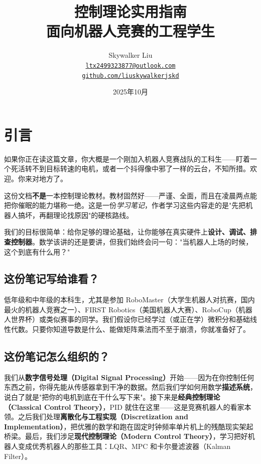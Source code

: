 \documentclass[UTF8]{ctexart}
\title{控制理论实用指南\\
\large 面向机器人竞赛的工程学生}
\author{Skywalker Liu\\
\href{mailto:ltx2499323877@outlook.com}{\texttt{ltx2499323877@outlook.com}} \quad\\
\quad
\href{https://github.com/liuskywalkerjskd}{\texttt{github.com/liuskywalkerjskd}}}
\date{2025年10月}
\begin{document}
\maketitle

\newpage
\tableofcontents
\newpage

\section{引言}

如果你正在读这篇文章，你大概是一个刚加入机器人竞赛战队的工科生——盯着一个死活转不到目标转速的电机，或者一个抖得像中邪了一样的云台，不知所措。欢迎。你来对地方了。

这份文档\textbf{不是}一本控制理论教材。教材固然好——严谨、全面，而且在凌晨两点能把你催眠的能力堪称一绝。这是一份\textit{学习笔记}，作者学习这些内容走的是"先把机器人搞坏，再翻理论找原因"的硬核路线。

我们的目标很简单：给你足够的理论基础，让你能够在真实硬件上\textbf{设计、调试、排查控制器}。数学该讲的还是要讲，但我们始终会问一句："当机器人上场的时候，这个到底有什么用？"

\subsection*{这份笔记写给谁看？}

低年级和中年级的本科生，尤其是参加 RoboMaster（大学生机器人对抗赛，国内最火的机器人竞赛之一）、FIRST Robotics（美国机器人大赛）、RoboCup（机器人世界杯）或类似赛事的同学。我们假设你已经学过（或正在学）微积分和基础线性代数。只要你知道导数是什么、能做矩阵乘法而不至于崩溃，你就准备好了。

\subsection*{这份笔记怎么组织的？}

我们从\textbf{数字信号处理（Digital Signal Processing）}开始——因为在你控制任何东西之前，你得先能从传感器拿到干净的数据。然后我们学如何用数学\textbf{描述系统}，说白了就是"把你的电机到底在干什么写下来"。接下来是\textbf{经典控制理论（Classical Control Theory）}，PID 就住在这里——这是竞赛机器人的看家本领。之后我们处理\textbf{离散化与工程实现（Discretization and Implementation）}，把优雅的数学和跑在固定时钟频率单片机上的残酷现实架起桥梁。最后，我们涉足\textbf{现代控制理论（Modern Control Theory）}，学习把好机器人变成优秀机器人的那些工具：LQR、MPC 和卡尔曼滤波器（Kalman Filter）。
\end{document}
